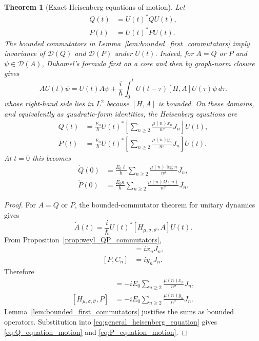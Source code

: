 \documentclass[11pt]{amsart}
\numberwithin{equation}{section}
\theoremstyle{plain}
\newtheorem{theorem}{Theorem}[section]
\theoremstyle{definition}
\theoremstyle{remark}
\newcommand{\Dom}{\mathcal{D}}
\newcommand{\Om}{\Omega}
\begin{document}
\begin{theorem}[Exact Heisenberg equations of motion]
\label{thm:equations_of_motion}
Let
\begin{align}
Q(t)
&=U(t)^*QU(t),
\label{eq:Qt_definition}\\
P(t)
&=U(t)^*PU(t).
\label{eq:Pt_definition}
\end{align}
The bounded commutators in Lemma~\ref{lem:bounded_first_commutators} imply invariance of $\Dom(Q)$ and $\Dom(P)$ under $U(t)$.  Indeed, for $A=Q$ or $P$ and $\psi\in\Dom(A)$, Duhamel's formula first on a core and then by graph-norm closure gives
\begin{equation}
A U(t)\psi=U(t)A\psi+\frac{i}{\hbar}\int_0^t U(t-\tau)[H,A]U(\tau)\psi\,d\tau.
\label{eq:duhamel_domain_invariance}
\end{equation}
whose right-hand side lies in $L^2$ because $[H,A]$ is bounded.  On these domains, and equivalently as quadratic-form identities, the Heisenberg equations are
\begin{align}
\dot Q(t)
&=
\frac{E_0}{\hbar}
U(t)^*
\left[
\sum_{n\ge2}
\frac{\mu(n)x_n}{n^{\sigma}}J_n
\right]
U(t),
\label{eq:Q_equation_motion}\\
\dot P(t)
&=
\frac{E_0}{\hbar}
U(t)^*
\left[
\sum_{n\ge2}
\frac{\mu(n)y_n}{n^{\sigma}}J_n
\right]
U(t).
\label{eq:P_equation_motion}
\end{align}
At $t=0$ this becomes
\begin{align}
\dot Q(0)
&=
\frac{E_0\ell}{\hbar}
\sum_{n\ge2}
\frac{\mu(n)\log n}{n^{\sigma}}J_n,
\label{eq:Qdot_zero}\\
\dot P(0)
&=
\frac{E_0\kappa}{\hbar}
\sum_{n\ge2}
\frac{\mu(n)\Om(n)}{n^{\sigma}}J_n.
\label{eq:Pdot_zero}
\end{align}
\end{theorem}

\begin{proof}
For $A=Q$ or $P$, the bounded-commutator theorem for unitary dynamics gives
\begin{equation}
\dot A(t)
=
\frac{i}{\hbar}U(t)^*[H_{\mu,\sigma,\vartheta},A]U(t).
\label{eq:general_heisenberg_equation}
\end{equation}
From Proposition~\ref{prop:weyl_QP_commutators},
\begin{align}
[Q,C_n]
&=ix_nJ_n,
\label{eq:Q_Cn_commutator}\\
[P,C_n]
&=iy_nJ_n.
\label{eq:P_Cn_commutator}
\end{align}
Therefore
\begin{align}
[H_{\mu,\sigma,\vartheta},Q]
&=
-iE_0\sum_{n\ge2}
\frac{\mu(n)x_n}{n^{\sigma}}J_n,
\label{eq:H_Q_commutator}\\
[H_{\mu,\sigma,\vartheta},P]
&=
-iE_0\sum_{n\ge2}
\frac{\mu(n)y_n}{n^{\sigma}}J_n.
\label{eq:H_P_commutator}
\end{align}
Lemma~\ref{lem:bounded_first_commutators} justifies the sums as bounded
operators.  Substitution into \eqref{eq:general_heisenberg_equation} gives
\eqref{eq:Q_equation_motion} and \eqref{eq:P_equation_motion}.
\end{proof}
\end{document}
